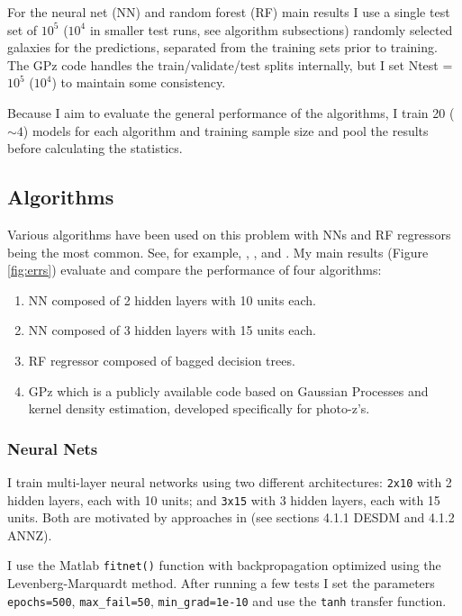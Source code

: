 \documentclass[13pt]{amsart}
\begin{document}
  For the neural net (NN) and random forest (RF) main results I use a single test set of $10^5$ ($10^4$ in smaller test runs, see algorithm subsections) randomly selected galaxies for the predictions, separated from the training sets prior to training. The GPz code handles the train/validate/test splits internally, but I set Ntest = $10^5$ ($10^4$) to maintain some consistency.

  Because I aim to evaluate the general performance of the algorithms, I train 20 ($\sim4$) models for each algorithm and training sample size and pool the results before calculating the statistics.



  \subsection{Algorithms}
  \label{sec:algors}

  Various algorithms have been used on this problem with NNs and RF regressors being the most common. See, for example, \cite{pzreview}, \cite{annz2}, and \cite{tpz}. My main results (Figure \ref{fig:errs}) evaluate and compare the performance of four algorithms:

  \begin{enumerate}
    \item NN composed of 2 hidden layers with 10 units each.
    \item NN composed of 3 hidden layers with 15 units each.
    \item RF regressor composed of bagged decision trees.
    \item GPz which is a publicly available code based on Gaussian Processes and kernel density estimation, developed specifically for photo-z's.
  \end{enumerate}



    \subsubsection{Neural Nets}
    \label{sec:NN}

      I train multi-layer neural networks using two different architectures: \texttt{2x10} with 2 hidden layers, each with 10 units; and \texttt{3x15} with 3 hidden layers, each with 15 units. Both are motivated by approaches in \cite{pzreview} (see sections 4.1.1 DESDM and 4.1.2 ANNZ).

      I use the Matlab \texttt{fitnet()} function with backpropagation optimized using the Levenberg-Marquardt method. After running a few tests I set the parameters \texttt{epochs=500}, \texttt{max\_fail=50}, \texttt{min\_grad=1e-10} and use the \texttt{tanh} transfer function.
\end{document}
